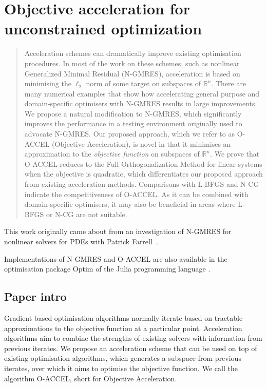 \documentclass[main.tex]{subfiles}
\begin{document}
\chapter{Objective acceleration for unconstrained optimization}\label{ch:objaccel}


\begin{quote}
  Acceleration schemes can dramatically improve existing optimisation
  procedures.  In most of the work on these schemes, such as nonlinear
  Generalized Minimal Residual (N-GMRES), acceleration is based on
  minimising the $\ell_2$ norm of some target on subspaces of
  $\mathbb{R}^n$.  There are many numerical examples that show how
  accelerating general purpose and domain-specific optimisers with
  N-GMRES results in large improvements. We propose a natural
  modification to N-GMRES, which significantly improves the
  performance in a testing environment originally used to advocate
  N-GMRES. Our proposed approach, which we refer to as O-ACCEL
  (Objective Acceleration), is novel in that it minimises an
  approximation to the \emph{objective function} on subspaces of
  $\mathbb{R}^n$.  We prove that O-ACCEL reduces to the Full
  Orthogonalization Method for linear systems when the objective is
  quadratic, which differentiates our proposed approach from existing
  acceleration methods.  Comparisons with L-BFGS and N-CG indicate the
  competitiveness of O-ACCEL. As it can be combined with
  domain-specific optimisers, it may also be beneficial in areas where
  L-BFGS or N-CG are not suitable.
\end{quote}

This work originally came about from an investigation of N-GMRES for
nonlinear solvers for PDEs with Patrick
Farrell~\citep{riseth2015nonlinear}.

Implementations of N-GMRES and O-ACCEL are also available in the
optimisation package Optim \citep{mogensen2018optim} of the Julia
programming language \citep{bezanson2017julia}.

\section{Paper intro}
Gradient based optimisation algorithms normally iterate based on
tractable approximations to the objective function at a particular
point.
Acceleration algorithms aim to combine the strengths of existing
solvers with information from previous iterates.  We propose an
acceleration scheme that can be used on top of existing optimisation
algorithms, which generates a subspace from previous iterates, over
which it aims to optimise the objective function. We call the
algorithm O-ACCEL, short for Objective Acceleration.
\end{document}
